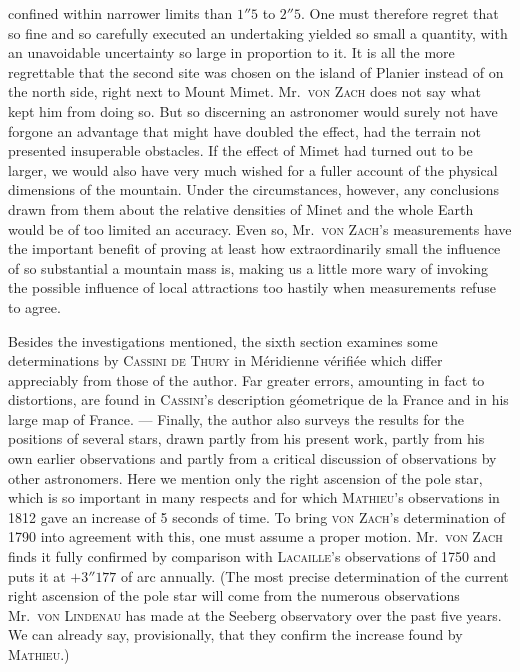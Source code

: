 confined within narrower limits than $1''5$ to $2''5$. One must therefore regret that so fine and so carefully executed an undertaking yielded so small a quantity, with an unavoidable uncertainty so large in proportion to it. It is all the more regrettable that the second site was chosen on the island of Planier instead of on the north side, right next to Mount Mimet. Mr.\ \textsc{von Zach} does not say what kept him from doing so. But so discerning an astronomer would surely not have forgone an advantage that might have doubled the effect, had the terrain not presented insuperable obstacles. If the effect of Mimet had turned out to be larger, we would also have very much wished for a fuller account of the physical dimensions of the mountain. Under the circumstances, however, any conclusions drawn from them about the relative densities of Minet and the whole Earth would be of too limited an accuracy. Even so, Mr.\ \textsc{von Zach}’s measurements have the important benefit of proving at least how extraordinarily small the influence of so substantial a mountain mass is, making us a little more wary of invoking the possible influence of local attractions too hastily when measurements refuse to agree.

Besides the investigations mentioned, the sixth section examines some determinations by \textsc{Cassini de Thury} in Méridienne vérifiée which differ appreciably from those of the author. Far greater errors, amounting in fact to distortions, are found in \textsc{Cassini}’s description géometrique de la France and in his large map of France. --- Finally, the author also surveys the results for the positions of several stars, drawn partly from his present work, partly from his own earlier observations and partly from a critical discussion of observations by other astronomers. Here we mention only the right ascension of the pole star, which is so important in many respects and for which \textsc{Mathieu}’s observations in 1812 gave an increase of 5 seconds of time. To bring \textsc{von Zach}’s determination of 1790 into agreement with this, one must assume a proper motion. Mr.\ \textsc{von Zach} finds it fully confirmed by comparison with \textsc{Lacaille}’s observations of 1750 and puts it at $+3''177$ of arc annually. (The most precise determination of the current right ascension of the pole star will come from the numerous observations Mr.\ \textsc{von Lindenau} has made at the Seeberg observatory over the past five years. We can already say, provisionally, that they confirm the increase found by \textsc{Mathieu}.)

